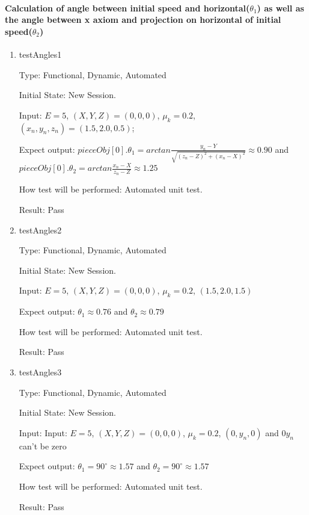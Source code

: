 \documentclass[12pt, titlepage]{article}
\begin{document}
\paragraph{Calculation of angle between initial speed and horizontal($\theta _{1}$) as well as the angle between x axiom and projection on horizontal of initial speed($\theta _{2}$)}
\begin{enumerate}
	\item{testAngles1\\}
	
	Type: Functional, Dynamic, Automated
	
	Initial State: New Session.
	
	Input: $E = 5$, $(X,Y,Z) = (0,0,0)$, $\mu_{k} = 0.2$, $(x_{n},y_{n},z_{n}) = (1.5, 2.0, 0.5)$;
	
	Expect output: $pieceObj[0].\theta_{1}=arctan \frac{y_{n} - Y}{\sqrt{(z_{n}-Z)^2+(x_{n}-X)^2}} \approx 0.90$ and $pieceObj[0].\theta_{2}=arctan \frac{x_{n}-X}{z_{n}-Z} \approx 1.25$
		
	How test will be performed: Automated unit test. 
	
	Result: Pass
	\item{testAngles2\\}
	
	Type: Functional, Dynamic, Automated
	
	Initial State: New Session.
	
	Input: $E = 5$, $(X,Y,Z) = (0,0,0)$, $\mu_{k} = 0.2$, $(1.5, 2.0, 1.5)$
	
	Expect output: $\theta_{1}\approx 0.76$ and $\theta_{2}\approx 0.79$
	
	How test will be performed: Automated unit test.
	
	Result: Pass
	
	\item{testAngles3\\}
	
	Type: Functional, Dynamic, Automated
	
	Initial State: New Session.
	
	Input: Input: $E = 5$, $(X,Y,Z) = (0,0,0)$, $\mu_{k} = 0.2$, $(0,y_{n},0)$ and $0y_{n}$ can't be zero
	
	Expect output: $\theta_{1}=90^{\circ} \approx 1.57$ and $\theta_{2}=90^{\circ} \approx 1.57$
	
	How test will be performed: Automated unit test.
	
	Result: Pass
	
\end{enumerate}
\end{document}
